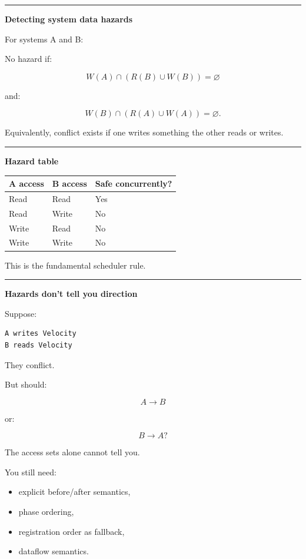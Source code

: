 \begin{center}\rule{0.5\linewidth}{0.5pt}\end{center}

\textbf{Detecting system data hazards}

For systems A and B:

No hazard if:

\[
W(A)\cap
(R(B)\cup W(B))
=
\varnothing
\]

and:

\[
W(B)\cap
(R(A)\cup W(A))
=
\varnothing.
\]

Equivalently, conflict exists if one writes something the other reads or writes.

\begin{center}\rule{0.5\linewidth}{0.5pt}\end{center}

\textbf{Hazard table}

{\def\LTcaptype{none} %
\begin{longtable}[]{@{}lll@{}}
\toprule\noalign{}
A access & B access & Safe concurrently? \\
\midrule\noalign{}
\endhead
\bottomrule\noalign{}
\endlastfoot
Read & Read & Yes \\
Read & Write & No \\
Write & Read & No \\
Write & Write & No \\
\end{longtable}
}

This is the fundamental scheduler rule.

\begin{center}\rule{0.5\linewidth}{0.5pt}\end{center}

\textbf{Hazards don't tell you direction}

Suppose:

\begin{verbatim}
A writes Velocity
B reads Velocity
\end{verbatim}

They conflict.

But should:

\[
A\rightarrow B
\]

or:

\[
B\rightarrow A?
\]

The access sets alone cannot tell you.

You still need:

\begin{itemize}
\tightlist
\item
  explicit before/after semantics,
\item
  phase ordering,
\item
  registration order as fallback,
\item
  dataflow semantics.
\end{itemize}

